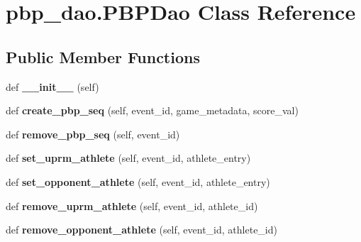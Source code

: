 \hypertarget{classpbp__dao_1_1_p_b_p_dao}{}\section{pbp\+\_\+dao.\+P\+B\+P\+Dao Class Reference}
\label{classpbp__dao_1_1_p_b_p_dao}
\subsection*{Public Member Functions}
\begin{DoxyCompactItemize}
\item 
\mbox{\label{classpbp__dao_1_1_p_b_p_dao_a5aac30804585d86dea92187134419440}} 
def {\bfseries \+\_\+\+\_\+init\+\_\+\+\_\+} (self)
\item 
\mbox{\label{classpbp__dao_1_1_p_b_p_dao_a24659fd140b68c143c515e66cb7fe0a1}} 
def {\bfseries create\+\_\+pbp\+\_\+seq} (self, event\+\_\+id, game\+\_\+metadata, score\+\_\+val)
\item 
\mbox{\label{classpbp__dao_1_1_p_b_p_dao_a7b3ded4ddfc48de0efd01aa2de100e78}} 
def {\bfseries remove\+\_\+pbp\+\_\+seq} (self, event\+\_\+id)
\item 
\mbox{\label{classpbp__dao_1_1_p_b_p_dao_a3f6520a448ebfd28b26164d1d2817134}} 
def {\bfseries set\+\_\+uprm\+\_\+athlete} (self, event\+\_\+id, athlete\+\_\+entry)
\item 
\mbox{\label{classpbp__dao_1_1_p_b_p_dao_ad6b803ab3414b4e4cb05dbcdc0c5df49}} 
def {\bfseries set\+\_\+opponent\+\_\+athlete} (self, event\+\_\+id, athlete\+\_\+entry)
\item 
\mbox{\label{classpbp__dao_1_1_p_b_p_dao_ac5be7a7bd0f06912a3278ca59cad9515}} 
def {\bfseries remove\+\_\+uprm\+\_\+athlete} (self, event\+\_\+id, athlete\+\_\+id)
\item 
\mbox{\label{classpbp__dao_1_1_p_b_p_dao_a9e32c1a60a0b13a355855aa74fefc1ea}} 
def {\bfseries remove\+\_\+opponent\+\_\+athlete} (self, event\+\_\+id, athlete\+\_\+id)
\item 

\end{DoxyCompactItemize}

